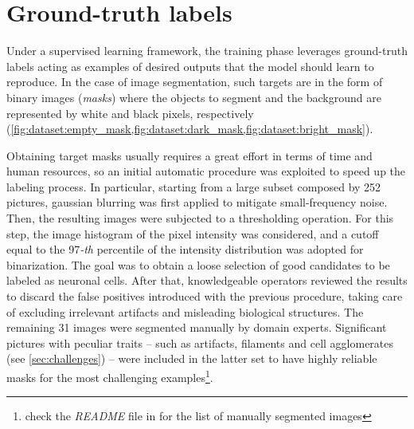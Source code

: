 \section{Ground-truth labels}
Under a supervised learning framework, the training phase leverages ground-truth labels acting as examples of desired outputs that the model should learn to reproduce. 
In the case of image segmentation, such targets are in the form of binary images (\textit{masks}) where the objects to segment and the background are represented by white and black pixels, respectively 
(\cref{fig:dataset:empty_mask,fig:dataset:dark_mask,fig:dataset:bright_mask}).

Obtaining target masks usually requires a great effort in terms of time and human resources, so an initial automatic procedure was exploited to speed up the labeling process. 
In particular, starting from a large subset composed by 252 pictures, gaussian blurring was first applied to mitigate small-frequency noise. 
Then, the resulting images were subjected to a thresholding operation.
For this step, the image histogram of the pixel intensity was considered, and a cutoff equal to the 97\emph{-th} percentile of the intensity distribution was adopted for binarization. 
The goal was to obtain a loose selection of good candidates to be labeled as neuronal cells. 
After that, knowledgeable operators reviewed the results to discard the false positives introduced with the previous procedure, taking care of excluding irrelevant artifacts and misleading biological structures.
The remaining 31 images were segmented manually by domain experts. Significant pictures with peculiar traits -- such as artifacts, filaments and cell agglomerates (see \cref{sec:challenges}) -- were included in the latter set to have highly reliable masks for the most challenging examples\footnote{check the \emph{README} file in  for the list of manually segmented images}. 



